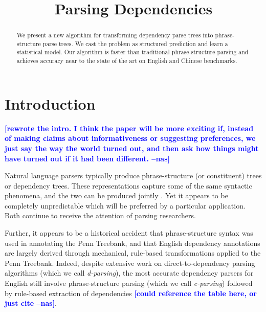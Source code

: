 \documentclass[11pt,letterpaper]{article}
\title{Parsing Dependencies}
\author{}
\date{}
\newcommand{\nascomment}[1]{\textcolor{blue}{\bf \small [#1 --nas]}}
\begin{document}
\maketitle
\begin{abstract}
We present a new algorithm for transforming dependency parse trees into
phrase-structure parse trees.  We cast the problem as  structured
prediction and learn a statistical model.  Our algorithm is faster than traditional
phrase-structure parsing and achieves accuracy near to the state of
the art on English and Chinese benchmarks.




\end{abstract}



\section{Introduction}

\nascomment{rewrote the intro.  I think the paper will be more
  exciting if, instead of making claims about informativeness or
  suggesting preferences, we just say the way the world turned out, and then
  ask how things might have turned out if it had been different.}

Natural language parsers typically produce phrase-structure (or
constituent) trees or dependency trees.  These representations capture
some of the same syntactic phenomena, and the two can be produced
jointly \cite{carreras2008tag,rush2010dual}.  Yet it
appears to be completely unpredictable which will be preferred by a
particular application.  Both continue to receive the attention of
parsing researchers.


Further, it appears to be a historical accident that phrase-structure
syntax was used in annotating the Penn Treebank, and that English
dependency annotations are largely derived through mechanical,
rule-based transformations applied to the Penn Treebank.  Indeed,
despite extensive work on direct-to-dependency parsing algorithms
(which we call \emph{d-parsing}), the most accurate dependency
parsers for English still involve phrase-structure parsing (which we
call \emph{c-parsing}) followed by rule-based extraction of
dependencies \cite{??} \nascomment{could reference the table here, or
  just cite}.
\end{document}
